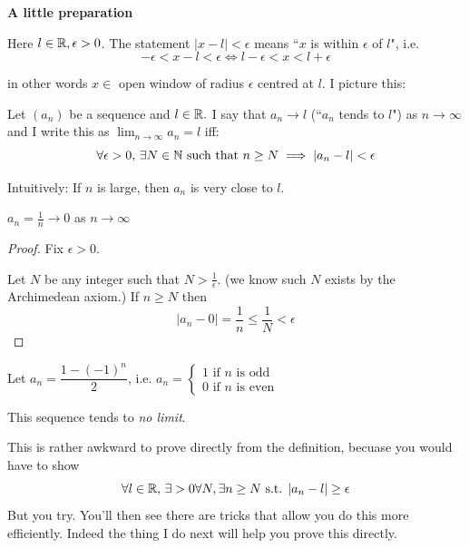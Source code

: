 \documentclass[10pt]{scrartcl}
\begin{document}
\textbf{A little preparation}

Here $l \in\mathbb{R}, \epsilon >0$. The statement $|x-l|<\epsilon$ means ``$x$ is within $\epsilon$ of $l$", i.e.
\[-\epsilon < x-l<\epsilon \iff l-\epsilon < x < l + \epsilon\]

in other words $x \in$ open window of radius $\epsilon$ centred at $l$. I picture this: 

\begin{center}
\end{center}


\begin{definition}
Let $(a_n)$ be a sequence and $l \in\mathbb{R}.$ I say that $a_n \to l$ (``$a_n$ tends to $l$") as $n \to \infty$ and I write this as $\lim_{n \to \infty} a_n = l$ iff: 
\[\forall \epsilon >0,\, \exists N \in\mathbb{N}\text{ such that } n \geq N \implies |a_n - l| < \epsilon\]
\end{definition}

Intuitively: If $n$ is large, then $a_n$ is very close to $l$.\\


\begin{example}
$a_n = \frac{1}{n} \to 0$ as $n \to \infty$
\begin{proof}
Fix $\epsilon >0$.

Let $N$ be any integer such that $N > \frac{1}{\epsilon}$. (we know such $N$ exists by the Archimedean axiom.) If $n \geq N$ then 
\[|a_n - 0| = \frac{1}{n} \leq \frac{1}{N} <\epsilon\]
\end{proof}
\end{example}\vspace*{5pt}

\begin{example}
Let $a_n = \dfrac{1-(-1)^n}{2}$, i.e. $a_n = \begin{cases}
 1 \mbox{ if $n$ is odd}\\
 0 \mbox{ if $n$ is even}	
 \end{cases}$
 
 This sequence tends to \emph{no limit}. 
 
 This is rather awkward to prove directly from the definition, becuase you would have to show 
 \[\forall l \in\mathbb{R},\, \exists >0 \forall N, \exists n \geq N\text{ s.t. } |a_n - l| \geq \epsilon\]
 But you try. You'll then see there are tricks that allow you do this more efficiently. Indeed the thing I do next will help you prove this directly. 
\end{example}\vspace*{5pt}
\end{document}
